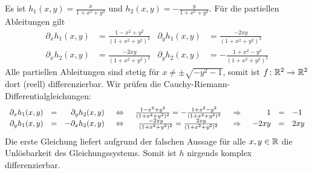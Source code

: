 \begin{exercisePage}
Es ist $h_1(x,y) = \frac{x}{1 + x^2 + y^2}$ und $h_2(x,y) = - \frac{y}{1 + x^2 + y^2}$. Für die partiellen Ableitungen gilt
\begin{align*}
	\partial_x h_1(x,y)  &= \frac{1-x^2+y^2}{(1 + x^2 + y^2)^2}	&	\partial_y h_1(x,y) &= \frac{-2xy}{(1 + x^2 + y^2)^2} \\
	\partial_x h_2(x,y)  &= \frac{-2xy}{(1 + x^2 + y^2)^2}		&	\partial_y h_2(x,y) &= -\frac{1+x^2-y^2}{(1 + x^2 + y^2)^2}
\end{align*}
Alle partiellen Ableitungen sind stetig für $x \neq \pm \sqrt{-y^2-1}$, somit ist $\abb{f}{\R^2}{\R^2}$ dort (reell) differenzierbar. Wir prüfen die Cauchy-Riemann-Differentialgleichungen:
\begin{equation*}
\begin{array}{rcrcccrcl}
	\partial_x h_1(x,y) &=& \partial_y h_2(x,y) &\enskip \Leftrightarrow \enskip& \frac{1-x^2+y^2}{(1 + x^2 + y^2)^2} = -\frac{1+x^2-y^2}{(1 + x^2 + y^2)^2} &\enskip \Rightarrow \enskip& 1 &=& -1 \\
	\partial_y h_1(x,y) &=& - \partial_x h_2(x,y)  &\enskip \Leftrightarrow \enskip& \frac{-2xy}{(1 + x^2 + y^2)^2} = \frac{2xy}{(1 + x^2 + y^2)^2} &\enskip \Rightarrow \enskip& -2xy &=& 2xy
\end{array}
\end{equation*}
Die erste Gleichung liefert aufgrund der falschen Aussage für alle $x,y \in \mathbb{R}$ die Unlösbarkeit des Gleichungssystems. Somit ist $h$ nirgends komplex differenzierbar.

\end{exercisePage}